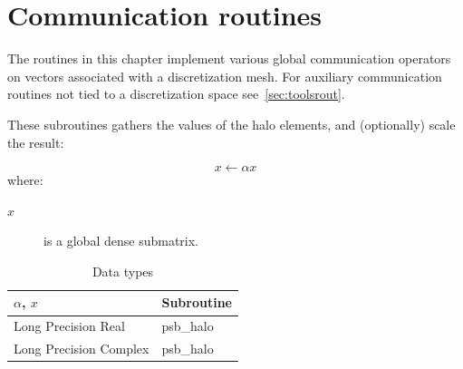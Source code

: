 \section{Communication routines}
%
%
The routines in this chapter implement various global communication operators
on vectors associated with a discretization mesh. For auxiliary communication
routines not tied to a discretization space see~\ref{sec:toolsrout}.


These subroutines gathers the values of the halo
elements, and  (optionally) scale the result:

\[ x \leftarrow \alpha x \]
where:
\begin{description}
\item[$x$] is a global dense  submatrix.
\end{description}

\begin{table}[h]
\begin{center}
\begin{tabular}{ll}
\hline
$\alpha$, $x$ & {\bf Subroutine}\\
\hline
Long Precision Real & psb\_halo \\
Long Precision Complex & psb\_halo \\
\hline
\end{tabular}
\end{center}
\caption{Data types\label{tab:f90halo}}
\end{table}


